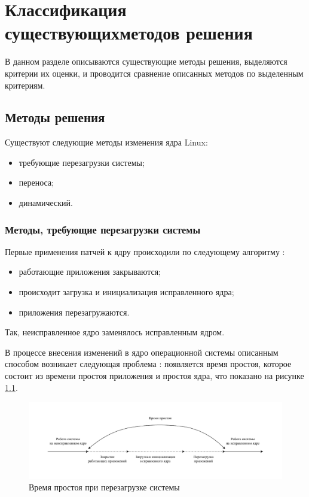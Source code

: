 \chapter{Классификация существующих\newline методов решения}

В данном разделе описываются существующие методы решения, выделяются критерии их оценки, и проводится сравнение описанных методов по выделенным критериям.

\section{Методы решения}

Существуют следующие методы изменения ядра Linux:

\begin{itemize}
	\item требующие перезагрузки системы;
	\item переноса;
	\item динамический.
\end{itemize}

\subsection{Методы, требующие перезагрузки системы}

Первые применения патчей к ядру происходили по следующему алгоритму \cite{dwarf}:

\begin{itemize}
	\item работающие приложения закрываются;
	\item происходит загрузка и инициализация исправленного ядра;
	\item приложения перезагружаются.
\end{itemize}

Так, неисправленное ядро заменялось исправленным ядром. 

В процессе внесения изменений в ядро операционной системы описанным способом возникает следующая проблема \cite{seamless}: появляется время простоя, которое состоит из времени простоя приложения и простоя ядра, что показано на рисунке \ref{img:downtime}.

\begin{figure}[H]
	\begin{center}
		\includegraphics[scale=0.7]{img/downtime.pdf}
	\end{center}
	\captionsetup{justification=centering}
	\caption{Время простоя при перезагрузке системы}
	\label{img:downtime}
\end{figure}

